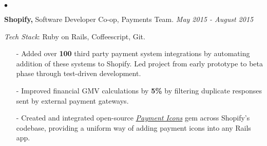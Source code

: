 \documentclass[11pt]{article}
\newenvironment{achievements}{\begin{list}{$\bullet$}{\topsep 0pt \itemsep -1.5pt \leftmargin 5pt}}{\vspace*{4pt}\end{list}}
\begin{document}
\begin{achievements}
\vspace{6pt}

\item \textbf{Shopify,} Software Developer Co-op, Payments Team. \hfill \textit {May 2015 - August 2015}

\vspace{1pt}
\item[ ] \textit{Tech Stack}: Ruby on Rails, Coffeescript, Git.
\vspace{3pt}

\begin{itemize}
\item[-]Added over \textbf{100} third party payment system integrations by automating addition of these systems to Shopify. Led project from early prototype to beta phase through test-driven development.
\vspace{3pt}
\item[-]Improved financial GMV calculations by \textbf{5\%} by filtering duplicate responses sent by external payment gateways.
\vspace{3pt}
\item[-]Created and integrated open-source \textit{\href{https://github.com/activemerchant/payment_icons}{Payment Icons}} gem across Shopify's codebase, providing a uniform way of adding payment icons into any Rails app.
\end{itemize}
\end{achievements}

\vspace{6pt}
\end{document}
